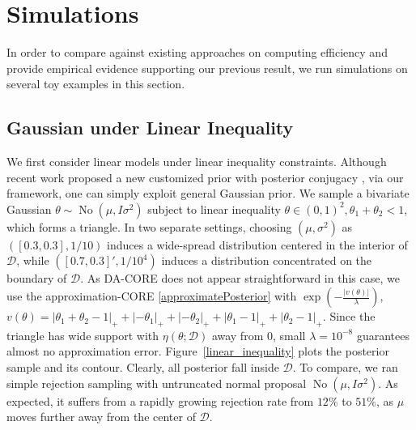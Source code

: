 \documentclass[10pt,fleqn]{article}
\newcommand{\mc}[1]{\mathcal{#1}}
\DeclareMathOperator{\No}{No}
\DeclareMathOperator{\1}{\mathbbm{1}}
\begin{document}
\section{Simulations}
In order to compare against existing approaches on computing efficiency and provide empirical evidence
supporting our previous result, we run simulations on several toy examples
 in this section.
   
\subsection{Gaussian  under Linear Inequality}
We first consider linear models under linear inequality constraints. Although
recent work proposed a new customized prior with posterior conjugacy \citep{danaher2012minkowski},
via our framework, one can simply exploit general Gaussian prior. We sample a bivariate Gaussian $\theta \sim \No \left( \mu, I\sigma^2\right)$ subject to linear inequality $\theta\in(0,1)^2,\theta_1+\theta_2<1$,
which forms a triangle. In two separate settings, choosing $(\mu, \sigma^2)$ as $([0.3,0.3],1/{10})$  induces a wide-spread distribution centered in the interior of $\mc D$, while $([0.7,0.3]',1/10^4)$  induces a  distribution concentrated on the boundary of $\mc D$. As DA-CORE does not appear straightforward
in this case, we use the approximation-CORE  \eqref{approximatePosterior} with $\exp(-\frac{|v(\theta)|}{\lambda})$,  $v(\theta)=|\theta_1+\theta_2-1|_+ + |-\theta_1|_+ + |-\theta_2|_ + + |\theta_1-1|_+ + |\theta_2-1|_+$.  Since the triangle has wide support with $\eta(\theta;\mc D)$ away from $0$, small $\lambda=10^{-8}$
 guarantees almost no approximation error. Figure~\ref{linear_inequality} plots the posterior sample and its contour. Clearly, all posterior fall inside
$\mc D$. To compare, we ran simple rejection sampling with untruncated normal proposal $\No ( \mu, I\sigma^2)$. As expected, it  suffers from a rapidly growing rejection rate from $12\%$ to $51\%$, as $\mu$ moves further away from the center of $\mc D$.
\end{document}
